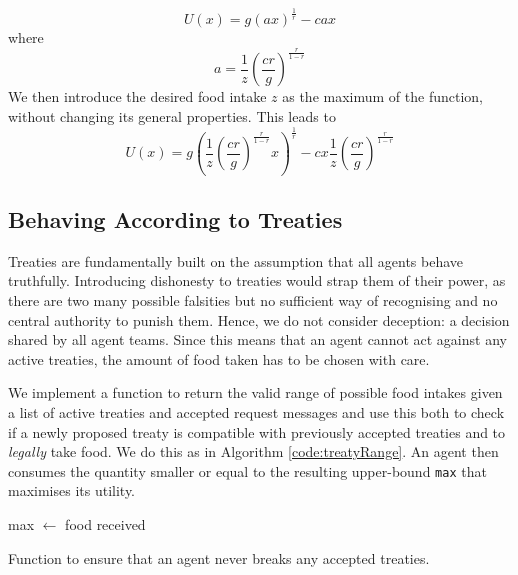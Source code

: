 \begin{equation}
    U(x)=g(ax)^\frac{1}{r}-cax
\end{equation}
where
\begin{equation}
    a=\frac{1}{z}\left(\frac{cr}{g}\right)^\frac{r}{1-r}
\end{equation}
We then introduce the desired food intake $z$ as the maximum of the function, without changing its general properties. This leads to
\begin{equation}
U\left(x\right)=g\left(\frac{1}{z}\left(\frac{cr}{g}\right)^{\frac{r}{1-r}}x\right)^{\frac{1}{r}}-cx\frac{1}{z}\left(\frac{cr}{g}\right)^{\frac{r}{1-r}}
\end{equation}
\subsection{Behaving According to Treaties}
Treaties are fundamentally built on the assumption that all agents behave truthfully. Introducing dishonesty to treaties would strap them of their power, as there are two many possible falsities but no sufficient way of recognising and no central authority to punish them. Hence, we do not consider deception: a decision shared by all agent teams. Since this means that an agent cannot act against any active treaties, the amount of food taken has to be chosen with care.

We implement a function to return the valid range of possible food intakes given a list of active treaties and accepted request messages and use this both to check if a newly proposed treaty is compatible with previously accepted treaties and to \textit{legally} take food. We do this as in Algorithm \ref{code:treatyRange}. An agent then consumes the quantity smaller or equal to the resulting upper-bound \texttt{max} that maximises its utility.

 \begin{algorithm}
        \BlankLine
        max $\gets$ food received \
        \BlankLine
        {
        \BlankLine
        }
        \caption{Function to ensure that an agent never breaks any accepted treaties.}
        \label{code:treatyRange}
\end{algorithm}




